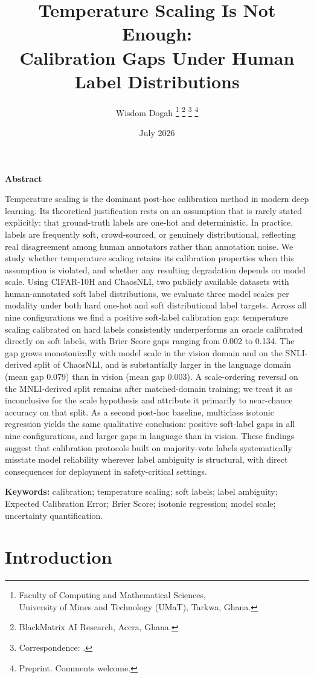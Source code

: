 \documentclass[11pt,a4paper]{article}
\title{%
  \textbf{Temperature Scaling Is Not Enough:}\\[0.35em]
  \textbf{Calibration Gaps Under Human Label Distributions}%
}
\author{%
  Wisdom Dogah%
  \thanks{\footnotesize Faculty of Computing and Mathematical Sciences,\\ University of Mines and Technology (UMaT), Tarkwa, Ghana.}%
  \thanks{\footnotesize BlackMatrix AI Research, Accra, Ghana.}%
  \thanks{\footnotesize Correspondence: \email{wisdom@blackmatrix.io}.}%
  \thanks{\footnotesize Preprint. Comments welcome.}%
}
\date{July 2026}
\theoremstyle{definition}
\renewcommand{\abstractname}{Abstract}
\renewenvironment{abstract}{%
  \centerline{\textbf{\abstractname}}\par\vspace{0.5em}%
  \small\justifying
}{%
  \par\vspace{0.6em}%
}
\begin{document}
\maketitle
\thispagestyle{plain}
\justifying

\begin{abstract}
Temperature scaling is the dominant post-hoc calibration method in
modern deep learning. Its theoretical justification rests on an
assumption that is rarely stated explicitly: that ground-truth labels
are one-hot and deterministic. In practice, labels are frequently soft,
crowd-sourced, or genuinely distributional, reflecting real disagreement
among human annotators rather than annotation noise. We study whether
temperature scaling retains its calibration properties when this
assumption is violated, and whether any resulting degradation depends on
model scale. Using CIFAR-10H and ChaosNLI, two publicly available
datasets with human-annotated soft label distributions, we evaluate
three model scales per modality under both hard one-hot and soft
distributional label targets. Across all nine configurations we find a
positive soft-label calibration gap: temperature scaling calibrated on
hard labels consistently underperforms an oracle calibrated directly on
soft labels, with Brier Score gaps ranging from 0.002 to 0.134. The gap
grows monotonically with model scale in the vision domain and on the
SNLI-derived split of ChaosNLI, and is substantially larger in the
language domain (mean gap 0.079) than in vision (mean gap 0.003). A
scale-ordering reversal on the MNLI-derived split remains after
matched-domain training; we treat it as inconclusive for the scale
hypothesis and attribute it primarily to near-chance accuracy on that
split. As a second post-hoc baseline, multiclass isotonic regression
yields the same qualitative conclusion: positive soft-label gaps in all
nine configurations, and larger gaps in language than in vision. These
findings suggest that calibration protocols built on majority-vote
labels systematically misstate model reliability wherever label
ambiguity is structural, with direct consequences for deployment in
safety-critical settings.

\noindent\textbf{Keywords:}
calibration;
temperature scaling;
soft labels;
label ambiguity;
Expected Calibration Error;
Brier Score;
isotonic regression;
model scale;
uncertainty quantification.
\end{abstract}

\section{Introduction}
\end{document}

